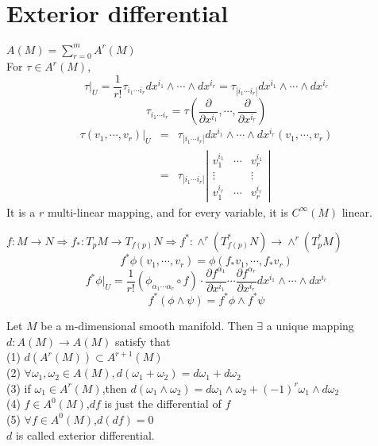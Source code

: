 \section{Exterior differential}
\begin{newdef}
$A(M) = \sum_{r=0}^{m} A^{r}(M)$\\
For $\tau \in A^r(M)$,
\[\tau|_{U} = \frac{1}{r!} \tau_{i_1\cdots i_r} dx^{i_1} \wedge \cdots \wedge dx^{i_r} = \tau_{|i_1\cdots i_r|} dx^{i_1} \wedge \cdots \wedge dx^{i_r}\] 
\[ \tau_{i_1\cdots i_r} = \tau(\frac{\partial}{\partial x^{i_1}},\cdots,\frac{\partial}{\partial x^{i_r}}) \]
\begin{eqnarray}
\tau(v_1,\cdots,v_r)|_{U} &=& \tau_{|i_1\cdots i_r|}dx^{i_1} \wedge \cdots \wedge dx^{i_r} (v_1,\cdots,v_r) \nonumber \\
&=& \tau_{|i_1\cdots i_r|} \left| \begin{matrix} v_1^{i_1}& \cdots & v_r^{i_1}\\ \vdots & & \vdots \\ v_1^{i_r} & \cdots & v_r^{i_r} \end{matrix} \right| \nonumber
\end{eqnarray}
It is a $r$ multi-linear mapping, and for every variable, it is $C^{\infty}(M)$ linear.
\end{newdef}

\begin{newprop}
$f:M \to N \Rightarrow f_{*}:T_{p}M \to T_{f(p)}N \Rightarrow f^{*}:\wedge^{r}(T_{f(p)}^{*}N) \to \wedge^{r}(T_p^*M) $\\
\[f^* \phi(v_1,\cdots,v_r) = \phi(f_*v_1,\cdots,f_*v_r)\]
\[f^*\phi|_U = \frac{1}{r!}(\phi_{\alpha_1\cdots\alpha_r} \circ f) \cdot \frac{\partial f^{\alpha_1}}{\partial x^{i_1}} \cdots \frac{\partial f^{\alpha_r}}{\partial x^{i_r}} dx^{i_1} \wedge \cdots \wedge dx^{i_r}\]
\[f^*(\phi \wedge \psi) = f^*\phi \wedge f^* \psi\]
\end{newprop}

\begin{newdef}
Let $M$ be a m-dimensional smooth manifold. Then $\exists$ a unique mapping $d:A(M) \to A(M)$ satisfy that\\
(1) $d(A^r(M)) \subset A^{r+1}(M)$\\
(2) $\forall \omega_1,\omega_2 \in A(M),d(\omega_1+\omega_2) = d\omega_1 +d\omega_2$\\
(3) if $\omega_1 \in A^r(M)$,then $d(\omega_1 \wedge \omega_2)=d\omega_1 \wedge \omega_2 +(-1)^r \omega_1 \wedge d\omega_2$\\
(4) $f \in A^0(M)$,$df$ is just the differential of $f$\\
(5) $\forall f \in A^0(M)$,$d(df)=0$\\
$d$ is called exterior differential.
\end{newdef}

